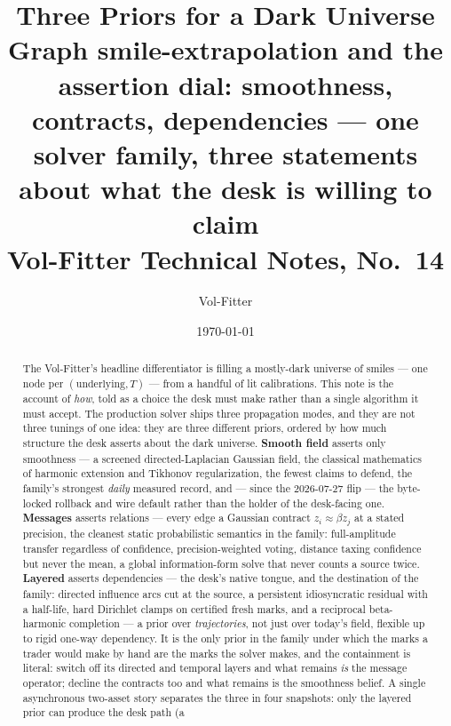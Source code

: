 \documentclass[11pt]{article}
\title{\textbf{Three Priors for a Dark Universe}\\[2pt]
\large Graph smile-extrapolation and the assertion dial: smoothness,
contracts, dependencies --- one solver family, three statements about
what the desk is willing to claim\\[2pt]
\normalsize Vol-Fitter Technical Notes, No.~14}
\author{Vol-Fitter}
\date{\today}
\begin{document}
\maketitle



\begin{abstract}
The Vol-Fitter's headline differentiator is filling a mostly-dark universe of
smiles --- one node per $(\text{underlying},T)$ --- from a handful of lit
calibrations.  This note is the account of \emph{how}, told as a choice the
desk must make rather than a single algorithm it must accept.  The production
solver ships three propagation modes, and they are not three tunings of one
idea: they are three different priors, ordered by how much structure the desk
asserts about the dark universe.  \textbf{Smooth field} asserts only
smoothness --- a screened directed-Laplacian Gaussian field, the classical
mathematics of harmonic extension and Tikhonov regularization, the fewest
claims to defend, the family's strongest \emph{daily} measured record, and
--- since the 2026-07-27 flip --- the byte-locked rollback and wire default
rather than the holder of the desk-facing one.  \textbf{Messages} asserts relations --- every edge a
Gaussian contract $z_i\approx\beta z_j$ at a stated precision, the cleanest
static probabilistic semantics in the family: full-amplitude transfer
regardless of confidence, precision-weighted voting, distance taxing
confidence but never the mean, a global information-form solve that never
counts a source twice.  \textbf{Layered} asserts dependencies --- the desk's
native tongue, and the destination of the family: directed influence arcs
cut at the source, a persistent idiosyncratic residual with a half-life,
hard Dirichlet clamps on certified fresh marks, and a reciprocal
beta-harmonic completion --- a prior over \emph{trajectories}, not just
over today's field, flexible up to rigid one-way dependency.  It is the
only prior in the family under which the marks a trader would make by hand
are the marks the solver makes, and the containment is literal: switch off
its directed and temporal layers and what remains \emph{is} the message
operator; decline the contracts too and what remains is the smoothness
belief.  A single asynchronous two-asset story separates the three in four
snapshots: only the layered prior can produce the desk path (a

\end{abstract}
\end{document}
